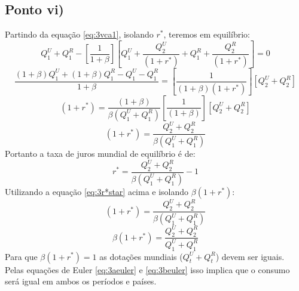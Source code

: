\documentclass{article}
\begin{document}
\subsection*{Ponto vi)}
Partindo da equação \eqref{eq:3vca1}, isolando $r^*$, teremos em equilíbrio:
\begin{equation}
    Q_1^{U}+Q_1^{R}-\left[\frac{1}{1+\beta}\right] \left[Q_1^{U}+\frac{Q_2^{U}}{(1+r^*)}+Q_1^{R}+\frac{Q_2^{R}}{(1+r^*)}\right]=0
\end{equation}
\begin{equation}
    \frac{(1+\beta)Q_1^U+(1+\beta)Q_1^R-Q_1^U-Q_1^R}{1+\beta}=
    \left[\frac{1}{(1+\beta)(1+r^*)}\right] 
    \left[Q_2^{U}+Q_2^{R}\right]
\end{equation}
\begin{equation}
    (1+r^*)=
    \frac{(1+\beta)}{\beta(Q_1^U+ Q_1^R)}
    \left[\frac{1}{(1+\beta)}\right] 
    \left[Q_2^{U}+Q_2^{R}\right]
\end{equation}
\begin{equation}
    (1+r^*)=
    \frac{Q_2^{U}+Q_2^{R}}{\beta(Q_1^U+Q_1^R)}
\end{equation}
Portanto a taxa de juros mundial de equilíbrio é de:
\begin{equation}\label{eq:3r*star}
    r^*=
    \frac{Q_2^{U}+Q_2^{R}}{\beta(Q_1^U+Q_1^R)}-1
\end{equation}
Utilizando a equação \eqref{eq:3r*star} acima e isolando $\beta(1+r^*)$:
\begin{equation}
    (1+r^*)=
    \frac{Q_2^{U}+Q_2^{R}}{\beta(Q_1^U+Q_1^R)}
\end{equation}
\begin{equation}
    \beta(1+r^*)=
    \frac{Q_2^{U}+Q_2^{R}}{Q_1^U+Q_1^R}
\end{equation}
Para que $\beta(1+r^*)=1$ as dotações mundiais ($Q_t^U+Q_t^R$) devem ser iguais.\\
Pelas equações de Euler \eqref{eq:3aeuler} e \eqref{eq:3beuler} isso implica que o consumo será igual em ambos os períodos e países.
\end{document}
